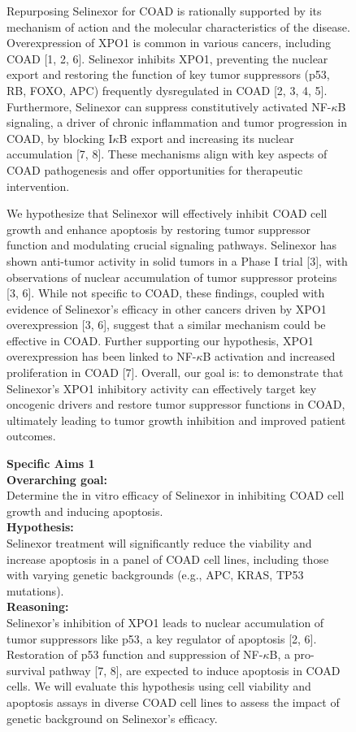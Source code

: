 \begin{figure}[htbp!]
\begin{tcolorbox}[title=Selinexor for colon cancer]
Repurposing Selinexor for COAD is rationally supported by its mechanism of action and the molecular characteristics of the disease. Overexpression of XPO1 is common in various cancers, including COAD [1, 2, 6]. Selinexor inhibits XPO1, preventing the nuclear export and restoring the function of key tumor suppressors (p53, RB, FOXO, APC) frequently dysregulated in COAD [2, 3, 4, 5]. Furthermore, Selinexor can suppress constitutively activated NF-$\kappa$B signaling, a driver of chronic inflammation and tumor progression in COAD, by blocking I$\kappa$B export and increasing its nuclear accumulation [7, 8]. These mechanisms align with key aspects of COAD pathogenesis and offer opportunities for therapeutic intervention.

We hypothesize that Selinexor will effectively inhibit COAD cell growth and enhance apoptosis by restoring tumor suppressor function and modulating crucial signaling pathways. Selinexor has shown anti-tumor activity in solid tumors in a Phase I trial [3], with observations of nuclear accumulation of tumor suppressor proteins [3, 6]. While not specific to COAD, these findings, coupled with evidence of Selinexor's efficacy in other cancers driven by XPO1 overexpression [3, 6], suggest that a similar mechanism could be effective in COAD. Further supporting our hypothesis, XPO1 overexpression has been linked to NF-$\kappa$B activation and increased proliferation in COAD [7].
Overall, our goal is: to demonstrate that Selinexor’s XPO1 inhibitory activity can effectively target key oncogenic drivers and restore tumor suppressor functions in COAD, ultimately leading to tumor growth inhibition and improved patient outcomes.

\textbf{Specific Aims 1}\\
\textbf{Overarching goal:}\\
Determine the in vitro efficacy of Selinexor in inhibiting COAD cell growth and inducing apoptosis.\\
\textbf{Hypothesis:}\\
Selinexor treatment will significantly reduce the viability and increase apoptosis in a panel of COAD cell lines, including those with varying genetic backgrounds (e.g., APC, KRAS, TP53 mutations).\\
\textbf{Reasoning:}\\
Selinexor's inhibition of XPO1 leads to nuclear accumulation of tumor suppressors like p53, a key regulator of apoptosis [2, 6]. Restoration of p53 function and suppression of NF-$\kappa$B, a pro-survival pathway [7, 8], are expected to induce apoptosis in COAD cells. We will evaluate this hypothesis using cell viability and apoptosis assays in diverse COAD cell lines to assess the impact of genetic background on Selinexor's efficacy.\\
\end{tcolorbox}
\end{figure}

